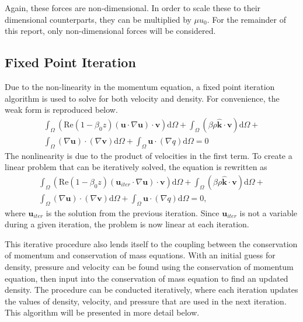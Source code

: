 \documentclass[12pt]{article}
\begin{document}
Again, these forces are non-dimensional. In order to scale these to their dimensional counterparts, they can be multiplied by $\mu u_0$. For the remainder of this report, only non-dimensional forces will be considered.

\subsection{Fixed Point Iteration}

Due to the non-linearity in the momentum equation, a fixed point iteration algorithm is used to solve for both velocity and density. For convenience, the weak form  is reproduced below.
\begin{equation}
\begin{split}
\label{eq:weakNS2}
\int_\Omega(\text{Re}(1-\beta_0z)(\mathbf{u}\cdot\nabla\mathbf{u})\cdot\mathbf{v})\text{d}\Omega+\int_\Omega(\beta\rho\mathbf{\hat{k}}\cdot\mathbf{v})\text{d}\Omega+\\
\int_\Omega(\nabla\mathbf{u})\cdot(\nabla\mathbf{v})\text{d}\Omega+\int_\Omega\mathbf{u}\cdot(\nabla q)\text{d}\Omega=0
\end{split}
\end{equation}
The nonlinearity is due to the product of velocities in the first term. To create a linear problem that can be iteratively solved, the equation is rewritten as
\begin{equation}
\begin{split}
\label{eq:weakNS3}
\int_\Omega(\text{Re}(1-\beta_0z)(\mathbf{u}_{iter}\cdot\nabla\mathbf{u})\cdot\mathbf{v})\text{d}\Omega+\int_\Omega(\beta\rho\mathbf{\hat{k}}\cdot\mathbf{v})\text{d}\Omega+\\
\int_\Omega(\nabla\mathbf{u})\cdot(\nabla\mathbf{v})\text{d}\Omega+\int_\Omega\mathbf{u}\cdot(\nabla q)\text{d}\Omega=0,
\end{split}
\end{equation}
where $\mathbf{u}_{iter}$ is the solution from the previous iteration. Since $\mathbf{u}_{iter}$ is not a variable during a given iteration, the problem is now linear at each iteration.

This iterative procedure also lends itself to the coupling between the conservation of momentum and conservation of mass equations. With an initial guess for density, pressure and velocity can be found using the conservation of momentum equation, then input into the conservation of mass equation to find an updated density. The procedure can be conducted iteratively, where each iteration updates the values of density, velocity, and pressure that are used in the next iteration. This algorithm will be presented in more detail below.
\end{document}
